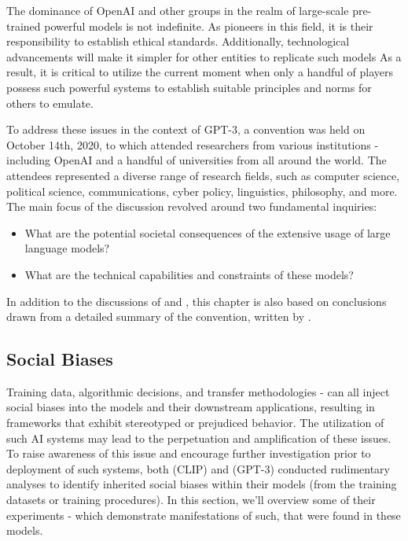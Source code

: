 \documentclass{article}
\begin{document}
\medskip
\noindent
The dominance of OpenAI and other groups in the realm of large-scale pre-trained powerful models is not indefinite. As pioneers in this field, it is their responsibility to establish ethical standards. Additionally, technological advancements will make it simpler for other entities to replicate such models As a result, it is critical to utilize the current moment when only a handful of players possess such powerful systems to establish suitable principles and norms for others to emulate.

\medskip
\noindent
To address these issues in the context of GPT-3, a convention was held on October 14th, 2020, to which attended researchers from various institutions - including OpenAI and a handful of universities from all around the world. The attendees represented a diverse range of research fields, such as computer science, political science, communications, cyber policy, linguistics, philosophy, and more. The main focus of the discussion revolved around two fundamental inquiries:
\begin{itemize}
    \item 
        What are the potential societal consequences of the extensive usage of large language models?
    \item
        What are the technical capabilities and constraints of these models?
\end{itemize}
In addition to the discussions of \citet{radford2021clip} and \citet{brown2020gpt3}, this chapter is also based on conclusions drawn from a detailed summary of the convention, written by \citet{tamkin2021convention}.



\subsection{Social Biases}
\label{sec:biases}

Training data, algorithmic decisions, and transfer methodologies - can all inject social biases into the models and their downstream applications, resulting in frameworks that exhibit stereotyped or prejudiced behavior. The utilization of such AI systems may lead to the perpetuation and amplification of these issues. To raise awareness of this issue and encourage further investigation prior to deployment of such systems, both \citet{radford2021clip} (CLIP) and \citet{brown2020gpt3} (GPT-3) conducted rudimentary analyses to identify inherited social biases within their models (from the training datasets or training procedures). In this section, we'll overview some of their experiments - which demonstrate manifestations of such, that were found in these models.
\end{document}
